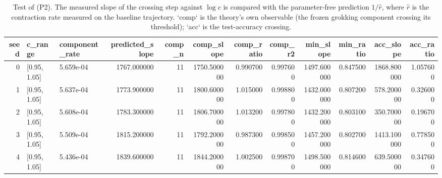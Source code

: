 \begin{table}
\caption{Test of (P2). The measured slope of the crossing step against $\log c$ is compared with the parameter-free prediction $1/\hat{r}$, where $\hat{r}$ is the contraction rate measured on the baseline trajectory. `comp` is the theory's own observable (the frozen grokking component crossing its threshold); `acc` is the test-accuracy crossing.}
\label{tab:p2}
\begin{tabular}{rllrrrrrrrrr}
\toprule
seed & c_range & component_rate & predicted_slope & comp_n & comp_slope & comp_ratio & comp_r2 & min_slope & min_ratio & acc_slope & acc_ratio \\
\midrule
0 & [0.95, 1.05] & 5.659e-04 & 1767.000000 & 11 & 1750.500000 & 0.990700 & 0.997600 & 1497.600000 & 0.847500 & 1868.800000 & 1.057600 \\
1 & [0.95, 1.05] & 5.637e-04 & 1773.900000 & 11 & 1800.600000 & 1.015000 & 0.998800 & 1432.000000 & 0.807200 & 578.200000 & 0.326000 \\
2 & [0.95, 1.05] & 5.608e-04 & 1783.300000 & 11 & 1806.700000 & 1.013200 & 0.997800 & 1432.200000 & 0.803100 & 350.700000 & 0.196700 \\
3 & [0.95, 1.05] & 5.509e-04 & 1815.200000 & 11 & 1792.200000 & 0.987300 & 0.998500 & 1457.200000 & 0.802700 & 1413.100000 & 0.778500 \\
4 & [0.95, 1.05] & 5.436e-04 & 1839.600000 & 11 & 1844.200000 & 1.002500 & 0.998700 & 1498.500000 & 0.814600 & 639.500000 & 0.347600 \\
\bottomrule
\end{tabular}
\end{table}
